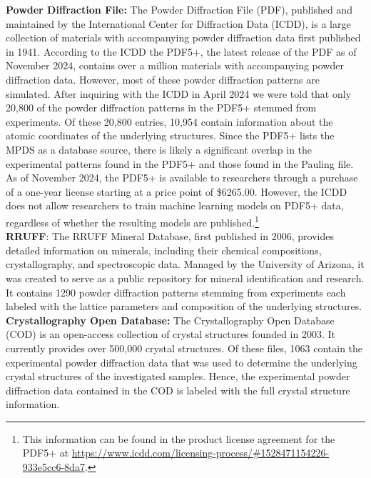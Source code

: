 \textbf{Powder Diffraction File:} \cite{PDFWeb} The Powder Diffraction File (PDF), published and maintained by the International Center for Diffraction Data (ICDD), is a large collection of materials with accompanying powder diffraction data first published in 1941\cite{GatesRector2019}. According to the ICDD the PDF5+, the latest release of the PDF as of November 2024, contains over a million materials with accompanying powder diffraction data. However, most of these powder diffraction patterns are simulated. After inquiring with the ICDD in April 2024 we were told that only 20,800 of the powder diffraction patterns in the PDF5+ stemmed from experiments. Of these 20,800 entries, 10,954 contain information about the atomic coordinates of the underlying structures. Since the PDF5+ lists the MPDS as a database source, there is likely a significant overlap in the experimental patterns found in the PDF5+ and those found in the Pauling file. As of November 2024, the PDF5+ is available to researchers through a purchase of a one-year license starting at a price point of \$6265.00. However, the ICDD does not allow researchers to train machine learning models on PDF5+ data, regardless of whether the resulting models are published.\footnote{This information can be found in the product license agreement for the PDF5+ at \url{https://www.icdd.com/licensing-process/\#1528471154226-933e5cc6-8da7}.} \\

\textbf{RRUFF}: \cite{RRUFFWeb} The RRUFF Mineral Database, first published in 2006, provides detailed information on minerals, including their chemical compositions, crystallography, and spectroscopic data. \cite{lafuente2015} Managed by the University of Arizona, it was created to serve as a public repository for mineral identification and research. It contains \num{1290} powder diffraction patterns stemming from experiments each labeled with the lattice parameters and composition of the underlying structures. \\

\textbf{Crystallography Open Database:} \cite{CODWeb} The Crystallography Open Database (COD) is an open-access collection of crystal structures founded in 2003\cite{Graulis2009cod}. It currently provides over 500,000 crystal structures. Of these files, 1063 contain the experimental powder diffraction data that was used to determine the underlying crystal structures of the investigated samples. Hence, the experimental powder diffraction data contained in the COD is labeled with the full crystal structure information. \\

